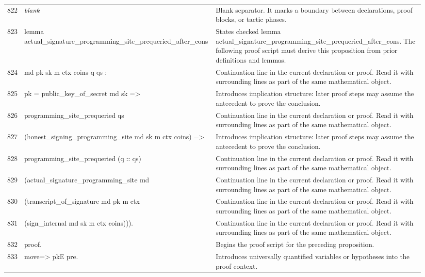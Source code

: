 \documentclass[10pt]{article}
\begin{document}
\begin{longtable}{r L{0.53\textwidth} L{0.37\textwidth}}
822 & {\ttfamily\scriptsize \emph{blank}} & Blank separator.  It marks a boundary between declarations, proof blocks, or tactic phases. \\
823 & {\ttfamily\scriptsize lemma actual\_signature\_programming\_site\_prequeried\_after\_cons} & States checked lemma actual\_signature\_programming\_site\_prequeried\_after\_cons.  The following proof script must derive this proposition from prior definitions and lemmas. \\
824 & {\ttfamily\scriptsize   md pk sk m ctx coins q qs :} & Continuation line in the current declaration or proof.  Read it with surrounding lines as part of the same mathematical object. \\
825 & {\ttfamily\scriptsize   pk = public\_key\_of\_secret md sk =>} & Introduces implication structure: later proof steps may assume the antecedent to prove the conclusion. \\
826 & {\ttfamily\scriptsize   programming\_site\_prequeried qs} & Continuation line in the current declaration or proof.  Read it with surrounding lines as part of the same mathematical object. \\
827 & {\ttfamily\scriptsize     (honest\_signing\_programming\_site md sk m ctx coins) =>} & Introduces implication structure: later proof steps may assume the antecedent to prove the conclusion. \\
828 & {\ttfamily\scriptsize   programming\_site\_prequeried (q :: qs)} & Continuation line in the current declaration or proof.  Read it with surrounding lines as part of the same mathematical object. \\
829 & {\ttfamily\scriptsize     (actual\_signature\_programming\_site md} & Continuation line in the current declaration or proof.  Read it with surrounding lines as part of the same mathematical object. \\
830 & {\ttfamily\scriptsize       (transcript\_of\_signature md pk m ctx} & Continuation line in the current declaration or proof.  Read it with surrounding lines as part of the same mathematical object. \\
831 & {\ttfamily\scriptsize         (sign\_internal md sk m ctx coins))).} & Continuation line in the current declaration or proof.  Read it with surrounding lines as part of the same mathematical object. \\
832 & {\ttfamily\scriptsize proof.} & Begins the proof script for the preceding proposition. \\
833 & {\ttfamily\scriptsize move=> pkE pre.} & Introduces universally quantified variables or hypotheses into the proof context. \\

\end{longtable}
\end{document}

